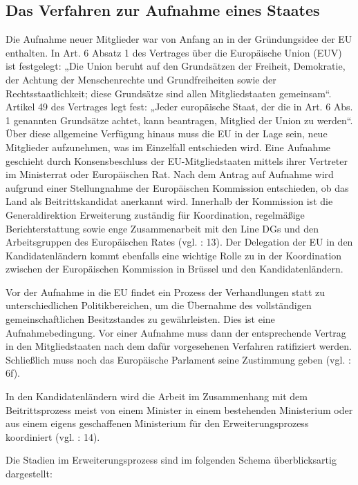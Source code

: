 \subsection{Das Verfahren zur Aufnahme eines Staates }
Die Aufnahme neuer Mitglieder war von Anfang an in der Gründungsidee der EU enthalten. In Art. 6 Absatz 1 des Vertrages über die Europäische Union (EUV) ist festgelegt: „Die Union beruht auf den Grundsätzen der Freiheit, Demokratie, der Achtung der Menschenrechte und Grundfreiheiten sowie der Rechtsstaatlichkeit; diese Grundsätze sind allen Mitgliedstaaten gemeinsam“. Artikel 49 des Vertrages legt fest: „Jeder europäische Staat, der die in Art. 6 Abs. 1 genannten Grundsätze achtet, kann beantragen, Mitglied der Union zu werden“. Über diese allgemeine Verfügung hinaus muss die EU in der Lage sein, neue Mitglieder aufzunehmen, was im Einzelfall entschieden wird. Eine Aufnahme geschieht durch Konsensbeschluss der EU-Mitgliedstaaten mittels ihrer Vertreter im Ministerrat oder Europäischen Rat. Nach dem Antrag auf Aufnahme wird aufgrund einer Stellungnahme der Europäischen Kommission entschieden, ob das Land als Beitrittskandidat anerkannt wird. Innerhalb der Kommission ist die Generaldirektion Erweiterung zuständig für Koordination, regelmäßige Berichterstattung sowie enge Zusammenarbeit mit den Line DGs und den Arbeitsgruppen des Europäischen Rates (vgl. \cite{summa} : 13). Der Delegation der EU in den Kandidatenländern kommt ebenfalls eine wichtige Rolle zu in der Koordination zwischen der Europäischen Kommission in Brüssel und den Kandidatenländern.\par
Vor der Aufnahme in die EU findet ein Prozess der Verhandlungen statt zu unterschiedlichen Politikbereichen, um die Übernahme des vollständigen gemeinschaftlichen Besitzstandes zu gewährleisten. Dies ist eine Aufnahmebedingung. Vor einer Aufnahme muss dann der entsprechende Vertrag in den Mitgliedstaaten nach dem dafür vorgesehenen Verfahren ratifiziert werden. Schließlich muss noch das Europäische Parlament seine Zustimmung geben (vgl. \cite{euko07} : 6f).
\par
In den Kandidatenländern wird die Arbeit im Zusammenhang mit dem Beitrittsprozess meist von einem Minister in einem bestehenden Ministerium oder aus einem eigens geschaffenen Ministerium für den Erweiterungsprozess koordiniert (vgl. \cite{summa} : 14).\par
Die Stadien im Erweiterungsprozess sind im folgenden Schema überblicksartig dargestellt:
